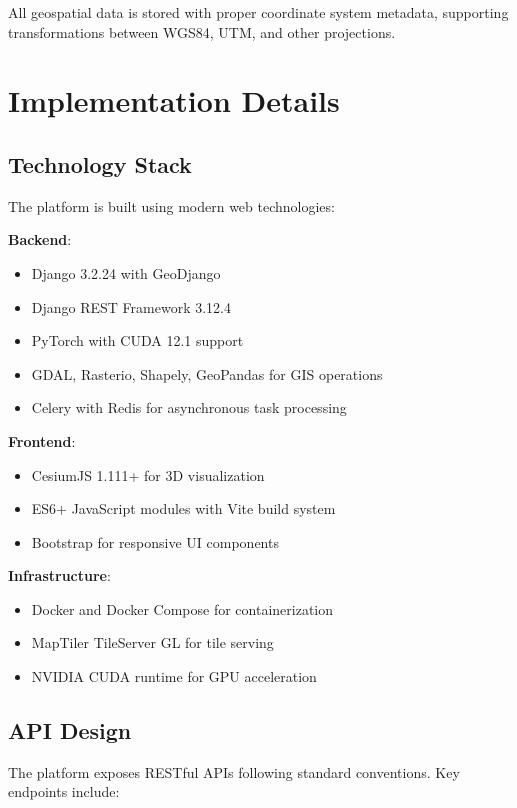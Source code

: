 \documentclass[conference]{IEEEtran}
\begin{document}
All geospatial data is stored with proper coordinate system metadata, supporting transformations between WGS84, UTM, and other projections.

\section{Implementation Details}

\subsection{Technology Stack}

The platform is built using modern web technologies:

\textbf{Backend}:
\begin{itemize}
    \item Django 3.2.24 with GeoDjango
    \item Django REST Framework 3.12.4
    \item PyTorch with CUDA 12.1 support
    \item GDAL, Rasterio, Shapely, GeoPandas for GIS operations
    \item Celery with Redis for asynchronous task processing
\end{itemize}

\textbf{Frontend}:
\begin{itemize}
    \item CesiumJS 1.111+ for 3D visualization
    \item ES6+ JavaScript modules with Vite build system
    \item Bootstrap for responsive UI components
\end{itemize}

\textbf{Infrastructure}:
\begin{itemize}
    \item Docker and Docker Compose for containerization
    \item MapTiler TileServer GL for tile serving
    \item NVIDIA CUDA runtime for GPU acceleration
\end{itemize}

\subsection{API Design}

The platform exposes RESTful APIs following standard conventions. Key endpoints include:
\end{document}
